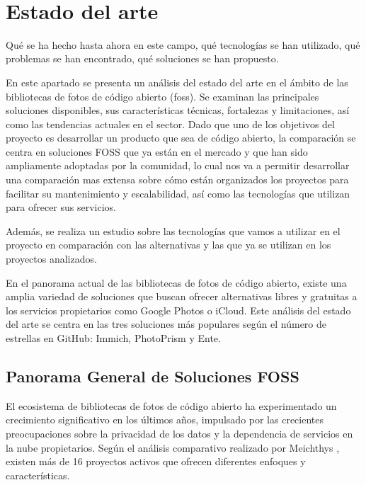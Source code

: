 \newpage
~
\newpage
\section{Estado del arte}
Qué se ha hecho hasta ahora en este campo, qué tecnologías se han utilizado, qué problemas se han encontrado, qué soluciones se han propuesto.

%
%


En este apartado se presenta un análisis del estado del arte en el ámbito de las bibliotecas de fotos de código abierto (\acrshort{foss}).
Se examinan las principales soluciones disponibles, sus características técnicas, fortalezas y limitaciones, así como las tendencias actuales en el sector.
Dado que uno de los objetivos del proyecto es desarrollar un producto que sea de código abierto, la comparación se centra en soluciones FOSS que ya están en el mercado y que han sido ampliamente adoptadas por la comunidad, lo cual nos va a permitir desarrollar una comparación mas extensa sobre cómo están organizados los proyectos para facilitar su mantenimiento y escalabilidad, así como las tecnologías que utilizan para ofrecer sus servicios.

Además, se realiza un estudio sobre las tecnologías que vamos a utilizar en el proyecto en comparación con las alternativas y las que ya se utilizan en los proyectos analizados.

En el panorama actual de las bibliotecas de fotos de código abierto, existe una amplia variedad de soluciones que buscan ofrecer alternativas libres y gratuitas a los servicios propietarios como Google Photos o iCloud. Este análisis del estado del arte se centra en las tres soluciones más populares según el número de estrellas en GitHub: Immich, PhotoPrism y Ente.

\subsection{Panorama General de Soluciones FOSS}

El ecosistema de bibliotecas de fotos de código abierto ha experimentado un crecimiento significativo en los últimos años, impulsado por las crecientes preocupaciones sobre la privacidad de los datos y la dependencia de servicios en la nube propietarios. Según el análisis comparativo realizado por Meichthys \parencite{meichthys2024}, existen más de 16 proyectos activos que ofrecen diferentes enfoques y características.

